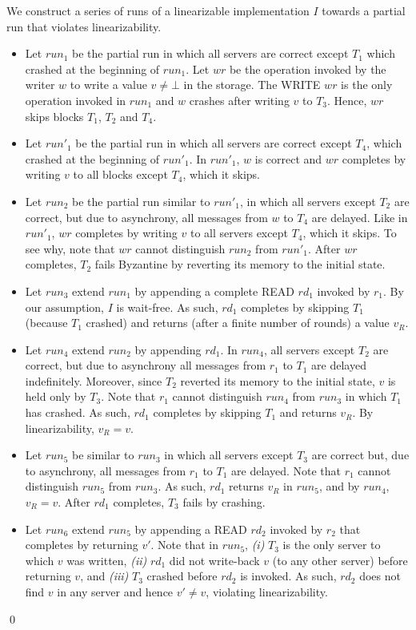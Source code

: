 \documentclass[10pt,conference,compsocconf]{IEEEtran}
\newenvironment{prooff}{\vspace{1ex}\noindent{\bf Proof:}\hspace{0.5em}}
	{\hfill\qed\vspace{1em}}
\begin{document}
\begin{prooff}
We construct a series of runs of a linearizable implementation $I$ towards a partial run that violates linearizability.
\begin{itemize}
\item Let $run_1$ be the partial run in which all servers are correct except $T_1$ which crashed at the beginning of $run_1$. Let $wr$ be the operation invoked by the writer $w$ to write a value $v \neq \bot$ in the storage. The \textsc{WRITE} $wr$ is the only operation invoked in $run_1$ and $w$ crashes after writing $v$ to $T_3$. Hence, $wr$ skips blocks $T_1$, $T_2$ and $T_4$.
\item Let $run'_1$ be the partial run in which all servers are correct except $T_4$, which crashed at the beginning of $run'_1$. In $run'_1$, $w$ is correct and $wr$ completes by writing $v$ to all blocks except $T_4$, which it skips.
\item Let $run_2$ be the partial run similar to $run'_1$, in which all servers except $T_2$ are correct, but due to asynchrony, all messages from $w$ to $T_4$ are delayed. Like in $run'_1$, $wr$ completes by writing $v$ to all servers except $T_4$, which it skips. To see why, note that $wr$ cannot distinguish $run_2$ from $run'_1$. After $wr$ completes, $T_2$ fails Byzantine by reverting its memory to the initial state.
\item Let $run_3$ extend $run_1$ by appending a complete \textsc{READ} $rd_1$ invoked by $r_1$. By our assumption, $I$ is wait-free. As such, $rd_1$ completes by skipping $T_1$ (because $T_1$ crashed) and returns (after a finite number of rounds) a value $v_R$.
\item Let $run_4$ extend $run_2$ by appending $rd_1$. In $run_4$, all servers except $T_2$ are correct, but due to asynchrony all messages from $r_1$ to $T_1$ are delayed indefinitely. Moreover, since $T_2$ reverted its memory to the initial state, $v$ is held only by $T_3$. Note that $r_1$ cannot distinguish $run_4$ from $run_3$ in which $T_1$ has crashed. As such, $rd_1$ completes by skipping $T_1$ and returns $v_R$. By linearizability, $v_R = v$.
\item Let $run_5$ be similar to $run_3$ in which all servers except $T_3$ are correct but, due to asynchrony, all messages from $r_1$ to $T_1$ are delayed. Note that $r_1$ cannot distinguish $run_5$ from $run_3$. As such, $rd_1$ returns $v_R$ in $run_5$, and by $run_4$, $v_R = v$. After $rd_1$ completes, $T_3$ fails by crashing.
\item Let $run_6$ extend $run_5$ by appending a \textsc{READ} $rd_2$ invoked by $r_2$ that completes by returning $v'$. Note that in $run_5$, \emph{(i)} $T_3$ is the only server to which $v$ was written, \emph{(ii)} $rd_1$ did not write-back $v$ (to any other server) before returning $v$, and \emph{(iii)} $T_3$ crashed before $rd_2$ is invoked. As such, $rd_2$ does not find $v$ in any server and hence $v' \neq v$, violating linearizability.
\end{itemize}
\vspace{-1.5 em}
\end{prooff}
\end{document}
